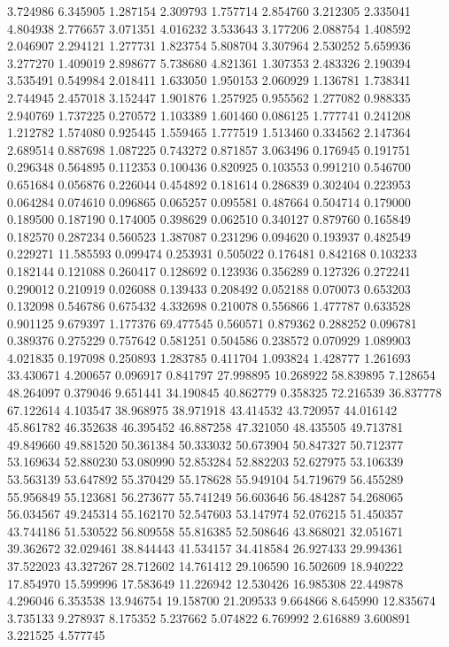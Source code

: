 3.724986
6.345905
1.287154
2.309793
1.757714
2.854760
3.212305
2.335041
4.804938
2.776657
3.071351
4.016232
3.533643
3.177206
2.088754
1.408592
2.046907
2.294121
1.277731
1.823754
5.808704
3.307964
2.530252
5.659936
3.277270
1.409019
2.898677
5.738680
4.821361
1.307353
2.483326
2.190394
3.535491
0.549984
2.018411
1.633050
1.950153
2.060929
1.136781
1.738341
2.744945
2.457018
3.152447
1.901876
1.257925
0.955562
1.277082
0.988335
2.940769
1.737225
0.270572
1.103389
1.601460
0.086125
1.777741
0.241208
1.212782
1.574080
0.925445
1.559465
1.777519
1.513460
0.334562
2.147364
2.689514
0.887698
1.087225
0.743272
0.871857
3.063496
0.176945
0.191751
0.296348
0.564895
0.112353
0.100436
0.820925
0.103553
0.991210
0.546700
0.651684
0.056876
0.226044
0.454892
0.181614
0.286839
0.302404
0.223953
0.064284
0.074610
0.096865
0.065257
0.095581
0.487664
0.504714
0.179000
0.189500
0.187190
0.174005
0.398629
0.062510
0.340127
0.879760
0.165849
0.182570
0.287234
0.560523
1.387087
0.231296
0.094620
0.193937
0.482549
0.229271
11.585593
0.099474
0.253931
0.505022
0.176481
0.842168
0.103233
0.182144
0.121088
0.260417
0.128692
0.123936
0.356289
0.127326
0.272241
0.290012
0.210919
0.026088
0.139433
0.208492
0.052188
0.070073
0.653203
0.132098
0.546786
0.675432
4.332698
0.210078
0.556866
1.477787
0.633528
0.901125
9.679397
1.177376
69.477545
0.560571
0.879362
0.288252
0.096781
0.389376
0.275229
0.757642
0.581251
0.504586
0.238572
0.070929
1.089903
4.021835
0.197098
0.250893
1.283785
0.411704
1.093824
1.428777
1.261693
33.430671
4.200657
0.096917
0.841797
27.998895
10.268922
58.839895
7.128654
48.264097
0.379046
9.651441
34.190845
40.862779
0.358325
72.216539
36.837778
67.122614
4.103547
38.968975
38.971918
43.414532
43.720957
44.016142
45.861782
46.352638
46.395452
46.887258
47.321050
48.435505
49.713781
49.849660
49.881520
50.361384
50.333032
50.673904
50.847327
50.712377
53.169634
52.880230
53.080990
52.853284
52.882203
52.627975
53.106339
53.563139
53.647892
55.370429
55.178628
55.949104
54.719679
56.455289
55.956849
55.123681
56.273677
55.741249
56.603646
56.484287
54.268065
56.034567
49.245314
55.162170
52.547603
53.147974
52.076215
51.450357
43.744186
51.530522
56.809558
55.816385
52.508646
43.868021
32.051671
39.362672
32.029461
38.844443
41.534157
34.418584
26.927433
29.994361
37.522023
43.327267
28.712602
14.761412
29.106590
16.502609
18.940222
17.854970
15.599996
17.583649
11.226942
12.530426
16.985308
22.449878
4.296046
6.353538
13.946754
19.158700
21.209533
9.664866
8.645990
12.835674
3.735133
9.278937
8.175352
5.237662
5.074822
6.769992
2.616889
3.600891
3.221525
4.577745
